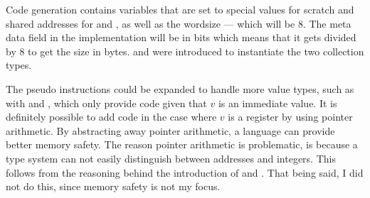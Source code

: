 Code generation contains variables that are set to  special values for scratch
and shared addresses for \mvscratch
and \mvshared, as well as the wordsize --- which will be 8.
The meta data field in the implementation will be in bits
which means that it gets divided by 8 to get the size in bytes.
\mvscratch and \mvshared were introduced to instantiate the two collection types.

The pseudo instructions could be expanded to handle more value types, such as
with \load and \store, which only provide code given that $v$ is an immediate
value.
It is definitely possible to add code in the case where $v$ is a register by
using pointer arithmetic. 
By abstracting away pointer arithmetic, a language can provide better memory
safety. The reason pointer arithmetic is problematic, is because a type system
can not easily distinguish between addresses and integers. This follows from
the reasoning behind the introduction of \mvscratch and \mvshared.
That being said, I did not do this, since memory safety is not my focus.


%     

